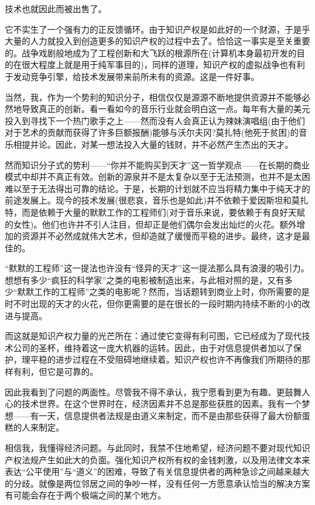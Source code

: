 技术也就因此而被出售了。

它不实生了一个强有力的正反馈循环。由于知识产权是如此好的一个财源，于是乎大量的人力就投入到创造更多的知识产权的过程中去了。恰恰这一事实是至关重要的。战争戏剧般地成为了工程创新和大飞跃的根源所在(计算机本身最初开发的目的在很大程度上就是用于纯军事目的)，同样的道理，知识产权的虚拟战争也有利于发动竞争引擎，给技术发展带来前所未有的资源。这是一件好事。

当然，我，作为一个势利的知识分子，相信仅仅是源源不断地提供资源并不能够必然地导致真正的创新。看一看如今的音乐行业就会明白这一点。每年有大量的美元投入到寻找下一个热门歌手之上——然而没有人会真正认为辣妹演唱组(由于他们对于艺术的贡献而获得了许多巨额报酬)能够与沃尔夫冈?莫扎特(他死于贫困)的音乐相提并论。因此，对某一想法投入大量的钱财，并不必然产生杰出的天才。

然而知识分子式的势利——“你并不能购买到天才”这一哲学观点——在长期的商业模式中却并不真正有效。创新的源泉并不是太复杂以至于无法预测，也并不是太困难以至于无法得出可靠的结论。于是，长期的计划就不应当将精力集中于纯天才的前途发展上。现今的技术发展(很悲哀，音乐也是如此)并不依赖于爱因斯坦和莫扎特，而是依赖于大量的默默工作的工程师们(对于音乐来说，要依赖于有良好天赋的女性)。他们也许并不引人注目，但却正是他们偶尔会发出灿烂的火花。额外增加的资源并不必然成就伟大艺术，但却造就了缓慢而平稳的进步。最终，这才是最佳的。

“默默的工程师”这一提法也许没有“怪异的天才”这一提法那么具有浪漫的吸引力。想想有多少“疯狂的科学家”之类的电影被制造出来，与此相对照的是，又有多少“默默工作的工程师”之类的电影呢？然而，当话题转到商业上时，你所需要的是时不时出现的天才的火花，但你更需要的是在很长的一段时期内持续不断的小的改进与提高。

而这就是知识产权力量的光芒所在：通过使它变得有利可图，它已经成为了现代技术公司的圣杯，维持着这一庞大机器的运转。因此，由于对信息提供者加以了保护，理平稳的进步过程在不受阻碍地继续着。知识产权也许不再像我们所期待的那样有利，但它是可靠的。

因此我看到了问题的两面性。尽管我不得不承认，我宁愿看到更为有趣、更鼓舞人心的技术世界。在这个世界时在，经济因素并不总是那些获胜的因素。我有一个梦想——有一天，信息提供者法规是由道义来制定，而不是由那些获得了最大份额蛋糕的人来制定。

相信我，我懂得经济问题。与此同时，我禁不住地希望，经济问题不要对现代知识产权法规产生如此大的负面。强化知识产权所有权的金钱刺激，以及用法律文本来表达“公平使用”与“道义”的困难，导致了有关信息提供者的两种急诊之间越来越大的分歧。就像是两位邻居之间的争吵一样，没有任何一方愿意承认恰当的解决方案有可能会存在于两个极端之间的某个地方。

